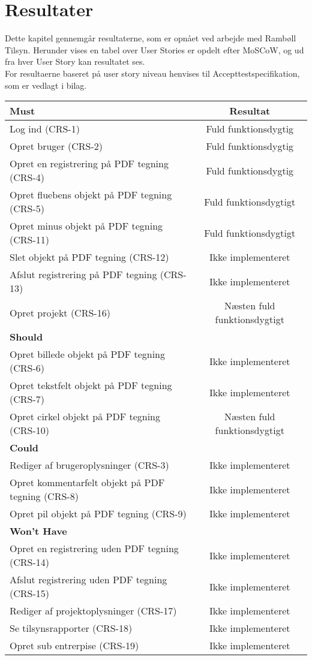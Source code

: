 \chapter{Resultater}
Dette kapitel gennemgår resultaterne, som er opnået ved arbejde med Rambøll Tilsyn. Herunder vises en tabel over User Stories er opdelt efter MoSCoW, og ud fra hver User Story kan resultatet ses.\\
For resultaerne baseret på user story niveau henvises til Accepttestspecifikation, som er vedlagt i bilag. \\
\begin{tabular}{ l | c  }
	\hline
	\textbf{Must} & \textbf{Resultat} \\ \hline
	Log ind (CRS-1) & Fuld funktionsdygtig \\
	\hline
	Opret bruger (CRS-2) & Fuld funktionsdygtig \\
	\hline
	Opret en registrering på PDF tegning (CRS-4) & Fuld funktionsdygtig\\
	\hline
	Opret fluebens objekt på PDF tegning (CRS-5) & Fuld funktionsdygtigt\\
	\hline
	Opret minus objekt på PDF tegning (CRS-11) & Fuld funktionsdygtigt\\
	\hline
	Slet objekt på PDF tegning (CRS-12) & Ikke implementeret\\
	\hline
	Afslut registrering på PDF tegning (CRS-13) & Ikke implementeret\\
	\hline
	Opret projekt (CRS-16) & Næsten fuld funktionsdygtigt\\
	\hline
	\hline
	\textbf{Should} &  \\ \hline
	Opret billede objekt på PDF tegning (CRS-6) & Ikke implementeret\\
	\hline
	Opret tekstfelt objekt på PDF tegning (CRS-7) & Ikke implementeret\\
	\hline
	Opret cirkel objekt på PDF tegning (CRS-10) & Næsten fuld funktionsdygtigt\\
	\hline
	\hline
	\textbf{Could} &  \\ \hline
	Rediger af brugeroplysninger (CRS-3) & Ikke implementeret\\
	\hline
	Opret kommentarfelt objekt på PDF tegning (CRS-8)  & Ikke implementeret\\
	\hline
	Opret pil objekt på PDF tegning (CRS-9) & Ikke implementeret\\
	\hline
	\hline
	\textbf{Won't Have} & \\ \hline
	Opret en registrering uden PDF tegning (CRS-14) & Ikke implementeret\\
	\hline
	Afslut registrering uden PDF tegning (CRS-15) & Ikke implementeret\\
	\hline
	Rediger af projektoplysninger (CRS-17) & Ikke implementeret\\
	\hline
	Se tilsynsrapporter (CRS-18) & Ikke implementeret\\
	\hline
	Opret sub entrerpise (CRS-19) & Ikke implementeret\\
	\hline
\end{tabular} \\


